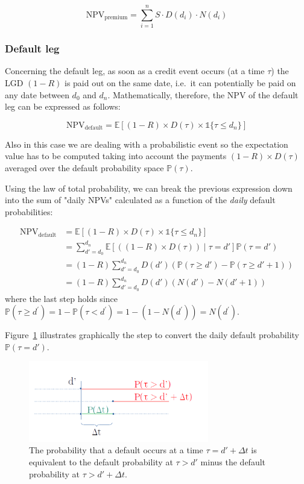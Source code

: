 \[\mathrm{NPV_{premium}} = \sum_{i=1}^{n} S \cdot D(d_i) \cdot N(d_i)\]

\subsubsection{Default leg}\label{default-leg}

Concerning the default leg, as soon as a credit event occurs (at a time $\tau$) the LGD \((1-R)\) is paid out on the same date, i.e.~it can potentially be paid on any date between \(d_0\) and \(d_n\). Mathematically, therefore, the NPV of the default leg can be expressed as follows:

\[
\mathrm{NPV_{default}} =\mathbb{E}[(1-R) \times D(\tau) \times \mathbb{1} \{\tau \leq d_n\} ]
\]

Also in this case we are dealing with a probabilistic event so the expectation value has to be computed taking into account the payments $(1-R)\times D(\tau)$ averaged over the default probability space $\mathbb{P}(\tau)$. 

Using the law of total probability, we can break the previous expression down into the sum
of "daily NPVs" calculated as a function of the \emph{daily} default
probabilities:

\begin{align*}
\mathrm{NPV_{default}} &= \mathbb{E}[(1-R) \times D(\tau) \times \mathbb{1}\{\tau \leq d_n\} ] \\
&= \sum_{d'=d_0}^{d_n} \mathbb{E}[ ((1-R) \times D(\tau)) \mid \tau = d'] \mathbb{P}(\tau = d') \\
&= (1-R) \sum_{d'=d_0}^{d_n} D(d') \left(\mathbb{P}(\tau \geq d') - \mathbb{P}( \tau \geq d'+1) \right) \\
&= (1-R) \sum_{d'=d_0}^{d_n} D(d') \left( N(d') - N(d'+1) \right)
\end{align*}
where the last step holds since $\mathbb{P}(\tau\geq d^{'}) = 1 - \mathbb{P}(\tau < d^{'}) = 1 - (1-N(d^{'})) = N(d^{'})$. 

Figure~\ref{fig:default_p} illustrates graphically the step to convert the daily default probability $\mathbb{P}(\tau=d')$.

\begin{figure}[htb]
	\centering
	\includegraphics[width=0.7\textwidth]{timeline.png}
	\caption{The probability that a default occurs at a time $\tau = d'+\Delta t$ is equivalent to the default probability at $\tau > d'$ minus the default probability at $\tau>d'+\Delta t$.}
	\label{fig:default_p}
\end{figure}

